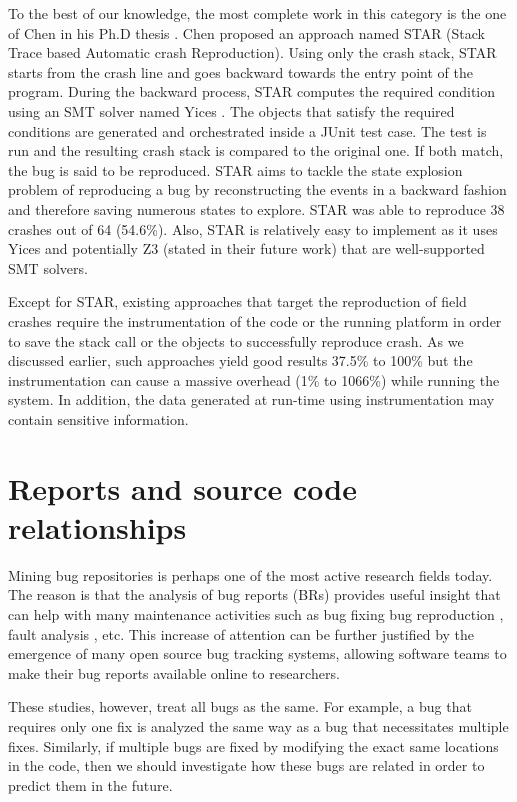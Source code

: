 To the best of our knowledge, the most complete work in this category is the one of Chen in his Ph.D thesis \cite{Chen2013a}.
Chen proposed an approach named STAR (Stack Trace based Automatic crash Reproduction).
Using only the crash stack, STAR starts from the crash line and goes backward towards the entry point of the program. During the backward process, STAR computes the required condition using an SMT solver named Yices \cite{Dutertre2006}.
The objects that satisfy the required conditions are generated and orchestrated inside a JUnit test case. The test is run and the resulting crash stack is compared to the original one.
If both match, the bug is said to be reproduced.
STAR aims to tackle the state explosion problem of reproducing a bug by reconstructing the events in a backward fashion and therefore saving numerous states to explore. STAR was able to reproduce 38 crashes out of 64 (54.6\%).
Also, STAR is relatively easy to implement as it uses Yices \cite{Dutertre2006} and potentially Z3 \cite{de2008z3} (stated in their future work) that are well-supported SMT solvers.

Except for STAR, existing approaches that target the reproduction of field crashes require the instrumentation of the code or the running platform in order to save the stack call or the objects to successfully reproduce crash.
As we discussed earlier, such approaches yield good results 37.5\% to 100\% but the instrumentation can cause a massive overhead (1\% to 1066\%) while running the system.
In addition, the data generated at run-time using instrumentation may contain sensitive information.

\section{Reports and source code relationships\label{rel:issue-rela}}

Mining bug repositories is perhaps one of the most active research fields today. The reason is that the analysis of bug reports (BRs) provides useful insight that can help with many maintenance activities such as bug fixing \cite{Weiß2007,Saha2014} bug reproduction \cite{Chen2013,Artzi2008,Jin2012}, fault analysis \cite{Nessa2008}, etc.
This increase of attention can be further justified by the emergence of many open source bug tracking systems, allowing software teams to make their bug reports available online to researchers.

These studies, however, treat all bugs as the same. For
example, a bug that requires only one fix is analyzed the same way as a bug that necessitates multiple fixes.
Similarly, if multiple bugs are fixed by modifying the exact same locations in the code, then we should investigate how these bugs are related in order to predict them in the future.

